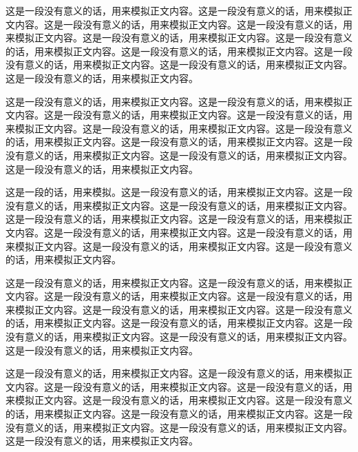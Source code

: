 
这是一段没有意义的话，用来模拟正文内容。这是一段没有意义的话，用来模拟正文内容。这是一段没有意义的话，用来模拟正文内容。这是一段没有意义的话，用来模拟正文内容。这是一段没有意义的话，用来模拟正文内容。这是一段没有意义的话，用来模拟正文内容。这是一段没有意义的话，用来模拟正文内容。这是一段没有意义的话，用来模拟正文内容。这是一段没有意义的话，用来模拟正文内容。这是一段没有意义的话，用来模拟正文内容。




这是一段没有意义的话，用来模拟正文内容。这是一段没有意义的话，用来模拟正文内容。这是一段没有意义的话，用来模拟正文内容。这是一段没有意义的话，用来模拟正文内容。这是一段没有意义的话，用来模拟正文内容。这是一段没有意义的话，用来模拟正文内容。这是一段没有意义的话，用来模拟正文内容。这是一段没有意义的话，用来模拟正文内容。这是一段没有意义的话，用来模拟正文内容。这是一段没有意义的话，用来模拟正文内容。



这是一段的话，用来模拟。这是一段没有意义的话，用来模拟正文内容。这是一段没有意义的话，用来模拟正文内容。这是一段没有意义的话，用来模拟正文内容。这是一段没有意义的话，用来模拟正文内容。这是一段没有意义的话，用来模拟正文内容。这是一段没有意义的话，用来模拟正文内容。这是一段没有意义的话，用来模拟正文内容。这是一段没有意义的话，用来模拟正文内容。这是一段没有意义的话，用来模拟正文内容。

这是一段没有意义的话，用来模拟正文内容。这是一段没有意义的话，用来模拟正文内容。这是一段没有意义的话，用来模拟正文内容。这是一段没有意义的话，用来模拟正文内容。这是一段没有意义的话，用来模拟正文内容。这是一段没有意义的话，用来模拟正文内容。这是一段没有意义的话，用来模拟正文内容。这是一段没有意义的话，用来模拟正文内容。这是一段没有意义的话，用来模拟正文内容。这是一段没有意义的话，用来模拟正文内容。

这是一段没有意义的话，用来模拟正文内容。这是一段没有意义的话，用来模拟正文内容。这是一段没有意义的话，用来模拟正文内容。这是一段没有意义的话，用来模拟正文内容。这是一段没有意义的话，用来模拟正文内容。这是一段没有意义的话，用来模拟正文内容。这是一段没有意义的话，用来模拟正文内容。这是一段没有意义的话，用来模拟正文内容。这是一段没有意义的话，用来模拟正文内容。这是一段没有意义的话，用来模拟正文内容。

